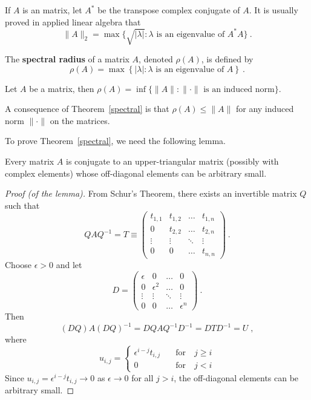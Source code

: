 \begin{rmk}
If $A$ is an \nn matrix, let $A^\ast$ be the transpose complex
conjugate of $A$.  It is usually proved in applied linear algebra that
\[
\|A\|_2 = \max \{ \sqrt{|\lambda|} : \lambda \text{ is an eigenvalue of }
A^\ast A \} \ .
\]  \label{iter_LE_eig1}
\end{rmk}

\begin{defn}
The {\bfseries spectral radius}
of a \nn matrix $A$, denoted $\rho (A)$, is defined by
\[
\rho (A) = \max \left\{ |\lambda| : \lambda \text{ is an eigenvalue of } A
\right\} \ .
\]  \label{iter_LE_eig2}
\end{defn}

\begin{theorem}
Let $A$ be a \nn matrix, then
$\rho(A) = \inf \{ \|A\| : \|\cdot\| \text{ is an induced norm} \}$.
\label{spectral}
\end{theorem}

\begin{rmk}
A consequence of Theorem~\ref{spectral} is that
$\rho (A) \leq \| A \|$ for any induced norm $\|\cdot\|$ on the
\nn matrices.  \label{iter_LE_eig3}
\end{rmk}

To prove Theorem~\ref{spectral}, we need the following lemma.

\begin{lemma}
Every \nn matrix $A$ is conjugate to an upper-triangular
matrix (possibly with complex elements) whose off-diagonal
elements can be arbitrary small.
\end{lemma}

\begin{proof}[Proof (of the lemma)]
From Schur's Theorem, there exists an invertible matrix $Q$ such that
\[
QAQ^{-1} = T \equiv
\begin{pmatrix}
t_{1,1} & t_{1,2} & \ldots & t_{1,n} \\
0 & t_{2,2} & \ldots & t_{2,n} \\
\vdots & \vdots & \ddots & \vdots \\
0 & 0 & \ldots & t_{n,n}
\end{pmatrix} \ .
\]
Choose $\epsilon > 0$ and let
\[
D = \begin{pmatrix}
\epsilon & 0 & \ldots & 0 \\
0 & \epsilon^2 & \ldots & 0 \\
\vdots & \vdots & \ddots & \vdots \\
0 & 0 & \ldots & \epsilon^n
\end{pmatrix} \ .
\]
Then
\[
(DQ)A(DQ)^{-1} = DQAQ^{-1}D^{-1} = DTD^{-1} = U \; ,
\]
where 
\[
u_{i,j} = \begin{cases}
\epsilon^{i-j} t_{i,j} & \quad \text{for} \quad j\geq i \\
0 & \quad \text{for}\quad  j<i
\end{cases}
\]
Since $u_{i,j} = \epsilon^{i-j} t_{i,j} \rightarrow 0$
as $\epsilon \rightarrow 0$ for all $j>i$, the off-diagonal elements
can be arbitrary small.
\end{proof}

